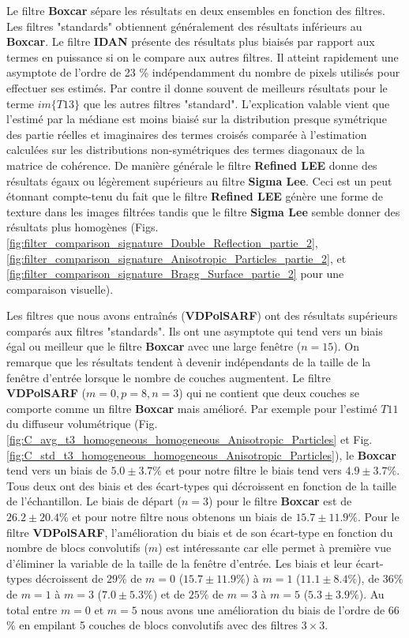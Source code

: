 Le filtre \textbf{Boxcar} sépare les résultats en deux ensembles en fonction des filtres. Les filtres "standards" obtiennent généralement des résultats inférieurs au \textbf{Boxcar}. Le filtre \textbf{IDAN} présente des résultats plus biaisés par rapport aux termes en puissance si on le compare aux autres filtres. Il atteint rapidement une asymptote de l'ordre de 23 \% indépendamment du nombre de pixels utilisés pour effectuer ses estimés. Par contre il donne souvent de meilleurs résultats pour le terme $im\{T13\}$ que les autres filtres "standard". L'explication valable vient que l'estimé par la médiane est moins biaisé sur la distribution presque symétrique des partie réelles et imaginaires des termes croisés comparée à l'estimation calculées sur les distributions non-symétriques des termes diagonaux de la matrice de cohérence. De manière générale le filtre \textbf{Refined LEE} donne des résultats égaux ou légèrement supérieurs au filtre \textbf{Sigma Lee}. Ceci est un peut étonnant compte-tenu du fait que le filtre \textbf{Refined LEE} génère une forme de texture dans les images filtrées tandis que le filtre \textbf{Sigma Lee} semble donner des résultats plus homogènes (Figs.  \ref{fig:filter_comparison_signature_Double_Reflection_partie_2},  \ref{fig:filter_comparison_signature_Anisotropic_Particles_partie_2}, et  \ref{fig:filter_comparison_signature_Bragg_Surface_partie_2} pour une comparaison visuelle).

Les filtres que nous avons entraînés (\textbf{VDPolSARF}) ont des résultats supérieurs comparés aux filtres "standards". Ils ont une asymptote qui tend vers un biais égal ou meilleur que le filtre \textbf{Boxcar} avec une large fenêtre ($n=15$). On remarque que les résultats tendent à devenir indépendants de la taille de la fenêtre d'entrée lorsque le nombre de couches augmentent. Le filtre \textbf{VDPolSARF} ($m=0, p=8, n=3$) qui ne contient que deux couches se comporte comme un filtre \textbf{Boxcar} mais amélioré. Par exemple pour l'estimé $T11$ du diffuseur volumétrique (Fig. \ref{fig:C_avg_t3_homogeneous_homogeneous_Anisotropic_Particles} et Fig.  \ref{fig:C_std_t3_homogeneous_homogeneous_Anisotropic_Particles}), le \textbf{Boxcar} tend vers un biais de $5.0 \pm 3.7 \% $ et pour notre filtre le biais tend vers $4.9 \pm 3.7 \%$. Tous deux ont des biais et des écart-types qui décroissent en fonction de la taille de l'échantillon.  Le biais de départ ($n=3$) pour le filtre \textbf{Boxcar} est de $26.2 \pm 20.4 \%$ et pour notre filtre nous obtenons un biais de $15.7 \pm 11.9 \%$. Pour le filtre \textbf{VDPolSARF}, l'amélioration du biais et de son écart-type en fonction du nombre de blocs convolutifs ($m$) est intéressante car elle permet à première vue d'éliminer la variable de la taille de la fenêtre d'entrée.  Les biais et leur écart-types décroissent de $29 \%$ de $m=0$ ($15.7 \pm 11.9 \%$) à $m=1$ ($11.1 \pm 8.4 \%$), de $36 \%$ de $m=1$ à $m=3$ ($7.0 \pm 5.3 \%$) et de $25 \%$ de $m=3$ à $m=5$ ($5.3 \pm 3.9 \%$).  Au total entre $m=0$ et $m=5$ nous avons une amélioration du biais de l'ordre de 66 \% en empilant 5 couches de blocs convolutifs avec des filtres $3 \times 3$.

